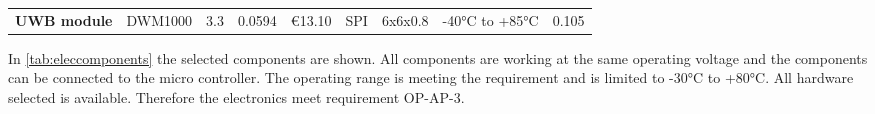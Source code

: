 \begin{table}[H]
\begin{scriptsize}
\begin{tabular}{l|lllrllll}
\textbf{UWB module}                                                       & DWM1000             & 3.3                                                                           & 0.0594                                                                         & €13.10                                                                                   & SPI                                                                        & 6x6x0.8                                                                     & -40°C to +85°C                                                        & 0.105                  
\end{tabular}
\end{scriptsize}
\end{table}


In \autoref{tab:eleccomponents} the selected components are shown. All components are working at the same operating voltage and the components can be connected to the micro controller. The operating range is meeting the requirement and is limited to -30°C to +80°C. All hardware selected is available. Therefore the electronics meet requirement OP-AP-3.


